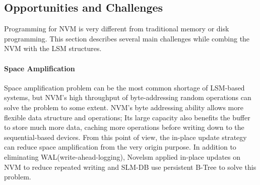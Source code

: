 \subsection{Opportunities and Challenges}

Programming for NVM is very different from traditional memory or disk programming. This section describes several main challenges while combing the NVM with the LSM structures.


\paragraph{Space Amplification}

Space amplification problem can be the most common shortage of LSM-based systems, but NVM's high throughput of byte-addressing random operations can solve the problem to some extent. NVM's byte addressing ability allows more flexible data structure and operations; Its large capacity also benefits the buffer to store much more data, caching more operations before writing down to the sequential-based devices. From this point of view, the in-place update strategy can reduce space amplification from the very origin purpose. In addition to eliminating WAL(write-ahead-logging), Novelsm\cite{kannan2018redesigning} applied in-place updates on NVM to reduce repeated writing and SLM-DB use persistent B-Tree to solve this problem.


%

